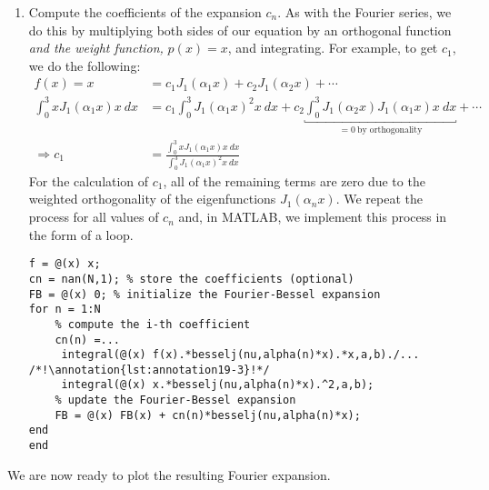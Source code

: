 \begin{enumerate}
\item Compute the coefficients of the expansion $c_n$.  As with the Fourier series, we do this by multiplying both sides of our equation by an orthogonal function \emph{and the weight function, } $p(x)=x$, and integrating. For example, to get $c_1$, we do the following:
\begin{align*}
f(x) = x &= c_1 J_1\left(\alpha_1 x\right) + c_2 J_1 \left(\alpha_2 x\right) + \cdots \\
\int_0^3 x J_1\left(\alpha_1 x\right) x \ dx &= c_1 \int_0^3 J_1\left(\alpha_1 x\right)^2 x \ dx + c_2 \underbracket{\int_0^3 J_1\left(\alpha_2 x \right) J_1 \left( \alpha_1 x \right) x \ dx}_{=0 \ \text{by orthogonality}} + \cdots \\
\Rightarrow c_1 &= \frac{\int_0^3 x J_1\left(\alpha_1 x\right) x \ dx}{\int_0^3 J_1\left(\alpha_1 x\right)^2 x \ dx}
\end{align*}
For the calculation of $c_1$, all of the remaining terms are zero due to the weighted orthogonality of the eigenfunctions $J_1\left(\alpha_n x \right)$.  We repeat the process for all values of $c_n$ and, in MATLAB, we implement this process in the form of a loop.
\begin{lstlisting}[name=lec19_ex,style=myMatlab]
f = @(x) x; 
cn = nan(N,1); % store the coefficients (optional)
FB = @(x) 0; % initialize the Fourier-Bessel expansion
for n = 1:N
    % compute the i-th coefficient
    cn(n) =...
     integral(@(x) f(x).*besselj(nu,alpha(n)*x).*x,a,b)./... /*!\annotation{lst:annotation19-3}!*/
     integral(@(x) x.*besselj(nu,alpha(n)*x).^2,a,b);
    % update the Fourier-Bessel expansion
    FB = @(x) FB(x) + cn(n)*besselj(nu,alpha(n)*x); 
end
end
\end{lstlisting}
\end{enumerate}
We are now ready to plot the resulting Fourier expansion.

